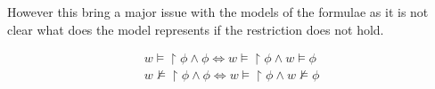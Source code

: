 However this bring a major issue with the models of the formulae
as it is not clear what does the model represents if the restriction
does not hold.

\begin{eqnarray}
w \models \restriction{\phi} \wedge \phi \Leftrightarrow 
  w \models \restriction{\phi} \wedge w \models \phi\\
w \not\models \restriction{\phi} \wedge \phi \Leftrightarrow
  w \models \restriction{\phi} \wedge w \not\models \phi
\end{eqnarray}


